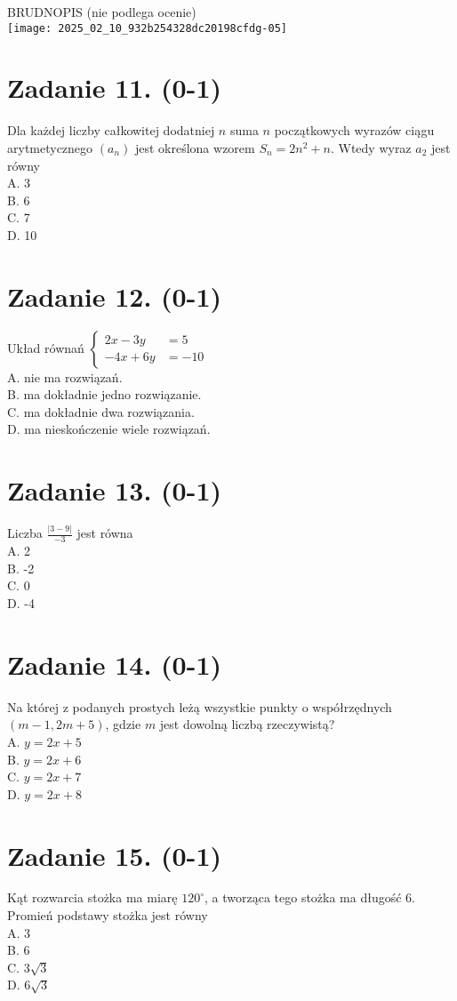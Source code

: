 \documentclass[10pt]{article}
\begin{document}
BRUDNOPIS (nie podlega ocenie)\\
\texttt{[image: 2025\_02\_10\_932b254328dc20198cfdg-05]}

\section*{Zadanie 11. (0-1)}
Dla każdej liczby całkowitej dodatniej \(n\) suma \(n\) początkowych wyrazów ciągu arytmetycznego \(\left(a_{n}\right)\) jest określona wzorem \(S_{n}=2 n^{2}+n\). Wtedy wyraz \(a_{2}\) jest równy\\
A. 3\\
B. 6\\
C. 7\\
D. 10

\section*{Zadanie 12. (0-1)}
Układ równań \(\left\{\begin{aligned} 2 x-3 y & =5 \\ -4 x+6 y & =-10\end{aligned}\right.\)\\
A. nie ma rozwiązań.\\
B. ma dokładnie jedno rozwiązanie.\\
C. ma dokładnie dwa rozwiązania.\\
D. ma nieskończenie wiele rozwiązań.

\section*{Zadanie 13. (0-1)}
Liczba \(\frac{|3-9|}{-3}\) jest równa\\
A. 2\\
B. -2\\
C. 0\\
D. -4

\section*{Zadanie 14. (0-1)}
Na której z podanych prostych leżą wszystkie punkty o współrzędnych \((m-1,2 m+5)\), gdzie \(m\) jest dowolną liczbą rzeczywistą?\\
A. \(y=2 x+5\)\\
B. \(y=2 x+6\)\\
C. \(y=2 x+7\)\\
D. \(y=2 x+8\)

\section*{Zadanie 15. (0-1)}
Kąt rozwarcia stożka ma miarę \(120^{\circ}\), a tworząca tego stożka ma długość 6. Promień podstawy stożka jest równy\\
A. 3\\
B. 6\\
C. \(3 \sqrt{3}\)\\
D. \(6 \sqrt{3}\)
\end{document}
